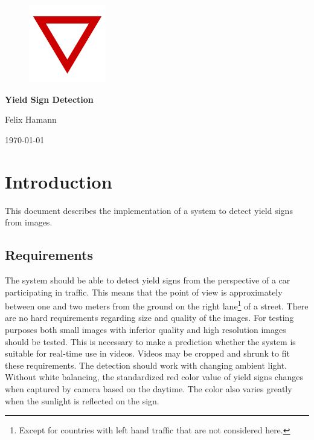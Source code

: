 \documentclass{report}
\begin{document}
%
%


{\centering

  \begin{figure}
    \vspace{3cm}

    \centering
    \includegraphics[width=0.3\textwidth]{src/yield}

    \vspace{4cm}
  \end{figure}


  {\Huge\textbf{Yield Sign Detection}}
  \vspace{.4cm}

  Felix Hamann

  \vspace{.2cm}

  \today

}


%
%

\tableofcontents


\chapter{Introduction}

This document describes the implementation of a system to detect yield
signs from images. {\color{red}{To be written: some introduction}}

\section{Requirements}

The system should be able to detect yield signs from the perspective
of a car participating in traffic. This means that the point of view
is approximately between one and two meters from the ground on the
right lane\footnote{Except for countries with left hand traffic that
  are not considered here.} of a street. There are no hard
requirements regarding size and quality of the images. For testing
purposes both small images with inferior quality and high resolution
images should be tested. This is necessary to make a prediction
whether the system is suitable for real-time use in videos. Videos may
be cropped and shrunk to fit these requirements. The detection should
work with changing ambient light. Without white balancing, the
standardized red color value of yield signs changes when captured by
camera based on the daytime. The color also varies greatly when the
sunlight is reflected on the sign.
\end{document}

